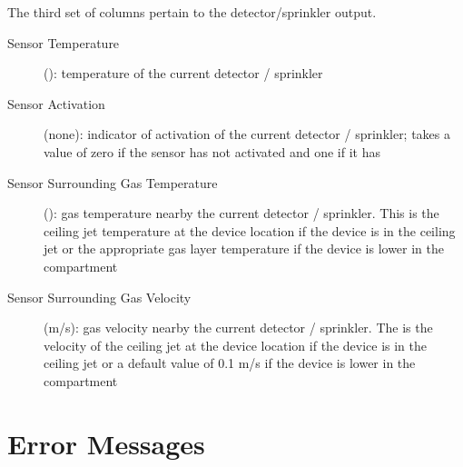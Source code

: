 The third set of columns pertain to the detector/sprinkler output.
\begin{description}
\item[Sensor Temperature] (\degc): temperature of the current detector / sprinkler
\item[Sensor Activation] (none): indicator of activation of the current detector / sprinkler; takes a value of zero if the sensor has not activated and one if it has
\item[Sensor Surrounding Gas Temperature] (\degc): gas temperature nearby the current detector / sprinkler. This is the ceiling jet temperature at the device location if the device is in the ceiling jet or the appropriate gas layer temperature if the device is lower in the compartment
\item[Sensor Surrounding Gas Velocity] (m/s): gas velocity nearby the current detector / sprinkler. The is the velocity of the ceiling jet at the device location if the device is in the ceiling jet or a default value of 0.1 m/s if the device is lower in the compartment
\end{description}

\newpage

\section{Error Messages}

